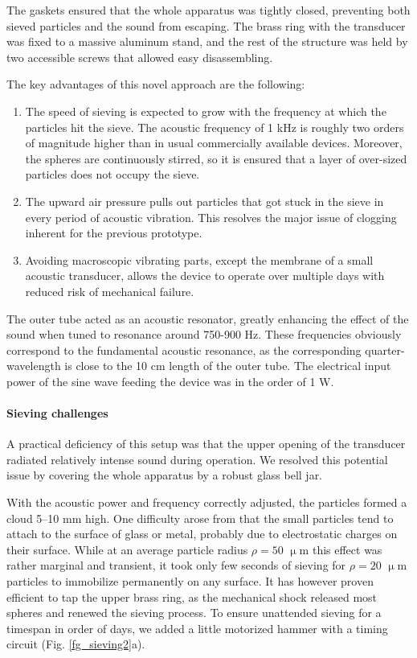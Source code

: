 The gaskets ensured that the whole apparatus was tightly closed, preventing both sieved particles and the sound from escaping. The brass ring with the transducer was fixed to a massive aluminum stand, and the rest of the structure was held by two accessible screws that allowed easy disassembling. 

The key advantages of this novel approach are the following:
\begin{enumerate}
 \item{The speed of sieving is expected to grow with the frequency at which the particles hit the sieve. The acoustic frequency of 1 kHz is roughly two orders of magnitude higher than in usual commercially available devices. Moreover, the spheres are  continuously stirred, so it is ensured that a layer of over-sized particles does not occupy the sieve.} 
 \item{The upward air pressure pulls out particles that got stuck in the sieve in every period of acoustic vibration. This resolves the major issue of clogging inherent for the previous prototype.} 
 \item{Avoiding macroscopic vibrating parts, except the membrane of a small acoustic transducer, allows the device to operate over multiple days with reduced risk of mechanical failure.}
 \end{enumerate}
The outer tube acted as an acoustic resonator, greatly enhancing the effect of the sound when tuned to resonance around 750-900 Hz. These frequencies obviously correspond to the fundamental acoustic resonance, as the corresponding quarter-wavelength is close to the 10 cm length of the outer tube.  The electrical input power of the sine wave feeding the device was in the order of 1 W.

\paragraph{Sieving challenges}%
A practical deficiency of this setup was that the upper opening of the transducer radiated relatively intense sound during operation. We resolved this potential issue by covering the whole apparatus by a robust glass bell jar.

With the acoustic power and frequency correctly adjusted, the particles formed a cloud 5--10 mm high. One difficulty arose from that the small particles tend to attach to the surface of glass or metal, probably due to electrostatic charges on their surface. While at an average particle radius $\rho = 50$ $\upmu$m this effect was rather marginal and transient, it took only few seconds of sieving for $\rho = 20$ $\upmu$m particles to immobilize permanently on any surface. It has however proven efficient to tap the upper brass ring, as the mechanical shock released most spheres and renewed the sieving process. To ensure unattended sieving for a timespan in order of days, we added a little motorized hammer with a timing circuit (Fig. \ref{fg_sieving2}a).


